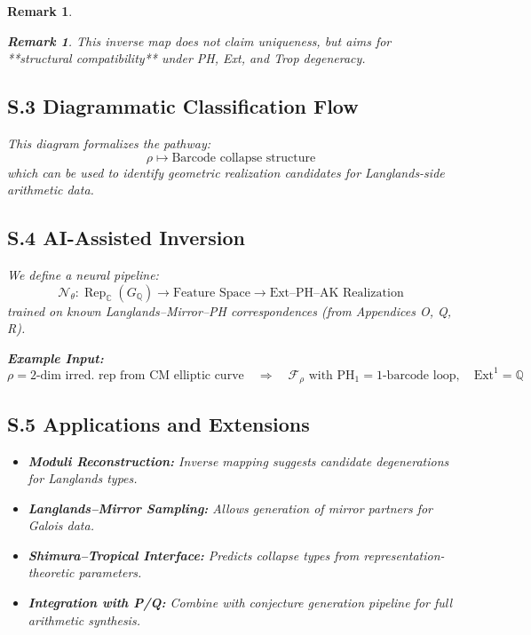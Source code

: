 \documentclass[11pt]{article}
\newtheorem{remark}[theorem]{Remark}
\begin{document}
\begin{remark}
\begin{remark}
This inverse map does not claim uniqueness, but aims for **structural compatibility** under PH, Ext, and Trop degeneracy.
\end{remark}

\subsection*{S.3 Diagrammatic Classification Flow}

\vspace{1em}
\begin{center}
\end{center}
\vspace{1em}

This diagram formalizes the pathway:
\[
\rho \mapsto \text{Barcode collapse structure}
\]
which can be used to identify geometric realization candidates for Langlands-side arithmetic data.

\subsection*{S.4 AI-Assisted Inversion}

We define a neural pipeline:
\[
\mathcal{N}_\theta: \operatorname{Rep}_{\mathbb{C}}(G_{\mathbb{Q}}) \to \text{Feature Space} \to \text{Ext–PH–AK Realization}
\]
trained on known Langlands–Mirror–PH correspondences (from Appendices O, Q, R).

\textbf{Example Input:}
\[
\rho = \text{2-dim irred. rep from CM elliptic curve}
\quad \Rightarrow \quad
\mathcal{F}_\rho \text{ with } \mathrm{PH}_1 = \text{1-barcode loop}, \quad \mathrm{Ext}^1 = \mathbb{Q}
\]

\subsection*{S.5 Applications and Extensions}

\begin{itemize}
  \item \textbf{Moduli Reconstruction:} Inverse mapping suggests candidate degenerations for Langlands types.
  \item \textbf{Langlands–Mirror Sampling:} Allows generation of mirror partners for Galois data.
  \item \textbf{Shimura–Tropical Interface:} Predicts collapse types from representation-theoretic parameters.
  \item \textbf{Integration with P/Q:} Combine with conjecture generation pipeline for full arithmetic synthesis.
\end{itemize}


\end{remark}
\end{document}

